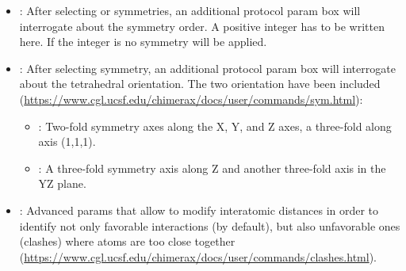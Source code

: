 \begin{itemize}
\begin{itemize}
            \begin{itemize}
            \item {}: \chimera orientation ; two-fold symmetry axes along the X, Y, and Z axes.
            \item {}: \chimera orientation ; \chimera orientation  rotated 90\degree about Z. 
            \item {}: \chimera orientation ; two-fold symmetry along Y and 5-fold along Z. 
            \item {}: \chimera orientation ; \chimera orientation  rotated 180\degree about X.
            \item {}: \chimera orientation ; two-fold symmetry along X and 3-fold along Z. 
            \item {}: \chimera orientation ; \chimera orientation  rotated 180\degree about Y.
            \item {}: \chimera orientation ; two-fold symmetry along X and 5-fold along Z.
            \item {}: \chimera orientation ; \chimera orientation  rotated 180\degree about Y.
            \end{itemize}
    \item {}: After selecting  or  symmetries, an additional protocol param box will interrogate about the symmetry order. A positive integer has to be written here. If the integer is  no symmetry will be applied. 
    \item {}: After selecting  symmetry, an additional protocol param box will interrogate about the tetrahedral orientation. The two \chimera orientation have been included (\url{https://www.cgl.ucsf.edu/chimerax/docs/user/commands/sym.html}):
            \begin{itemize}
            \item {}: Two-fold symmetry axes along the X, Y, and Z axes, a three-fold along axis (1,1,1).
            \item {}: A three-fold symmetry axis along Z and another three-fold axis in the YZ plane.
            \end{itemize}
    \item {}: Advanced params that allow to modify interatomic distances in order to identify not only favorable interactions (by default), but also unfavorable ones (clashes) where atoms are too close together (\url{https://www.cgl.ucsf.edu/chimerax/docs/user/commands/clashes.html}).

\end{itemize}
\end{itemize}
